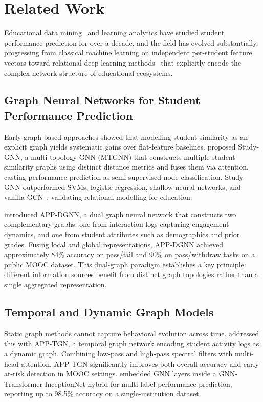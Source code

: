 \documentclass[sigconf]{acmart}
\begin{document}
\section{Related Work}
\label{sec:related}

Educational data mining~\citep{baker2010data} and learning
analytics have studied student performance prediction for over
a decade, and the field has evolved substantially, progressing
from classical machine learning on independent per-student
feature vectors toward relational deep learning
methods~\citep{zhou2020graph} that explicitly encode the
complex network structure of educational ecosystems.

\subsection{Graph Neural Networks for Student Performance Prediction}

Early graph-based approaches showed that modelling student similarity as
an explicit graph yields systematic gains over flat-feature baselines.
\citet{li2022studygnn} proposed Study-GNN, a multi-topology GNN (MTGNN)
that constructs multiple student similarity graphs using distinct distance
metrics and fuses them via attention, casting performance prediction as
semi-supervised node classification. Study-GNN outperformed SVMs, logistic
regression, shallow neural networks, and vanilla
GCN~\citep{kipf2017semi}, validating relational
modelling for education.

\citet{huang2024dual} introduced APP-DGNN, a dual graph neural network
that constructs two complementary graphs: one from interaction logs
capturing engagement dynamics, and one from student attributes such as
demographics and prior grades. Fusing local and global representations,
APP-DGNN achieved approximately 84\% accuracy on pass/fail and 90\% on
pass/withdraw tasks on a public MOOC dataset. This dual-graph paradigm
establishes a key principle: different information sources benefit from
distinct graph topologies rather than a single aggregated representation.

\subsection{Temporal and Dynamic Graph Models}

Static graph methods cannot capture behavioral evolution across time.
\citet{huang2024temporal} addressed this with APP-TGN, a temporal graph
network encoding student activity logs as a dynamic graph. Combining
low-pass and high-pass spectral filters with multi-head attention, APP-TGN
significantly improves both overall accuracy and early at-risk detection in
MOOC settings. \citet{zhang2025gnttinet} embedded GNN layers inside a
GNN-Transformer-InceptionNet hybrid for multi-label performance prediction,
reporting up to 98.5\% accuracy on a single-institution dataset.
\end{document}
